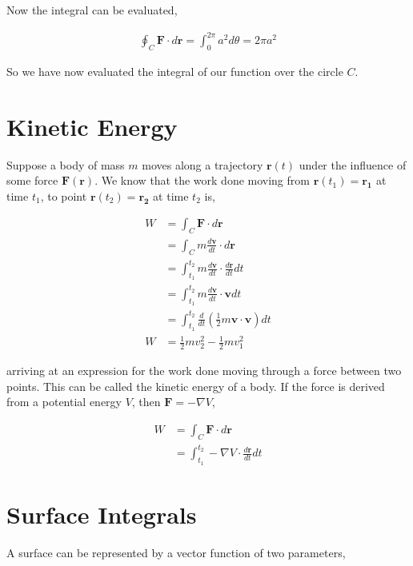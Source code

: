 \documentclass[11pt]{amsart}
\begin{document}
Now the integral can be evaluated,

\begin{align*}
  \oint_C \mathbf{F} \cdot d\mathbf{r} = \int_0^{2\pi} a^2 d\theta = 2\pi a^2
\end{align*}

So we have now evaluated the integral of our function over the circle $C$.

\section{Kinetic Energy}

Suppose a body of mass $m$ moves along a trajectory $\mathbf{r}(t)$ under the influence of some force $\mathbf{F}(\mathbf{r})$. We know that the work done moving from $\mathbf{r}(t_1)=\mathbf{r_1}$ at time $t_1$, to point $\mathbf{r}(t_2)=\mathbf{r_2}$ at time $t_2$ is,

\begin{align*}
  W &= \int_C \mathbf{F} \cdot d\mathbf{r} \\
    &= \int_C m \frac{d\mathbf{v}}{dt} \cdot d\mathbf{r} \\
    &= \int_{t_1}^{t_2} m \frac{d\mathbf{v}}{dt} \cdot \frac{d\mathbf{r}}{dt} dt \\
    &= \int_{t_1}^{t_2} m \frac{d\mathbf{v}}{dt} \cdot \mathbf{v} dt \\
    &= \int_{t_1}^{t_2} \frac{d}{dt} \left(\frac{1}{2}m \mathbf{v} \cdot \mathbf{v}\right) dt \\
  W &= \frac{1}{2}m v_2^2 - \frac{1}{2}m v_1^2
\end{align*}

arriving at an expression for the work done moving through a force between two points. This can be called the kinetic energy of a body. If the force is derived from a potential energy $V$, then $\mathbf{F} = -\nabla V$,

\begin{align*}
  W &= \int_C \mathbf{F} \cdot d\mathbf{r} \\
    &= \int_{t_1}^{t_2} -\nabla V \cdot \frac{d\mathbf{r}}{dt} dt
\end{align*}

\section{Surface Integrals}

A surface can be represented by a vector function of two parameters,
\end{document}
